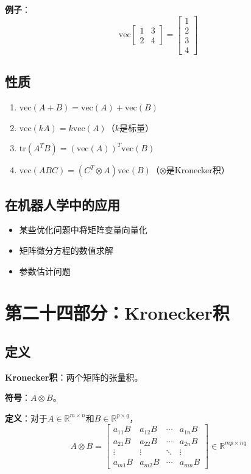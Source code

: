 \documentclass[12pt,a4paper]{article}
\begin{document}
\textbf{例子}：
\begin{equation}
\text{vec}\begin{bmatrix} 1 & 3 \\ 2 & 4 \end{bmatrix} = \begin{bmatrix} 1 \\ 2 \\ 3 \\ 4 \end{bmatrix}
\end{equation}

\subsection{性质}

\begin{enumerate}
\item $\text{vec}(A + B) = \text{vec}(A) + \text{vec}(B)$
\item $\text{vec}(kA) = k \text{vec}(A)$（$k$是标量）
\item $\text{tr}(A^T B) = (\text{vec}(A))^T \text{vec}(B)$
\item $\text{vec}(ABC) = (C^T \otimes A) \text{vec}(B)$（$\otimes$是Kronecker积）
\end{enumerate}

\subsection{在机器人学中的应用}

\begin{itemize}
\item 某些优化问题中将矩阵变量向量化
\item 矩阵微分方程的数值求解
\item 参数估计问题
\end{itemize}

\section{第二十四部分：Kronecker积}

\subsection{定义}

\textbf{Kronecker积}：两个矩阵的张量积。

\textbf{符号}：$A \otimes B$。

\textbf{定义}：对于$A \in \mathbb{R}^{m \times n}$和$B \in \mathbb{R}^{p \times q}$，
\begin{equation}
A \otimes B = \begin{bmatrix} a_{11}B & a_{12}B & \cdots & a_{1n}B \\ a_{21}B & a_{22}B & \cdots & a_{2n}B \\ \vdots & \vdots & \ddots & \vdots \\ a_{m1}B & a_{m2}B & \cdots & a_{mn}B \end{bmatrix} \in \mathbb{R}^{mp \times nq}
\end{equation}
\end{document}
